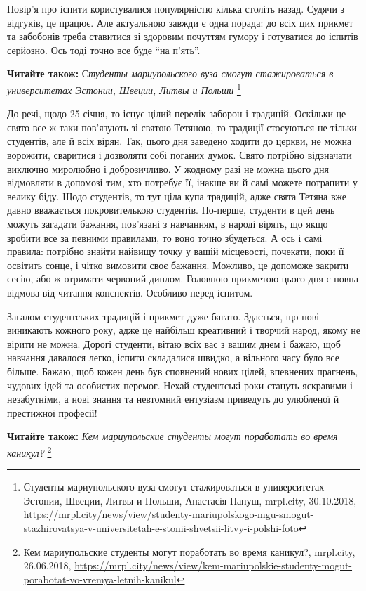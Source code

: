 
Повір'я про іспити користувалися популярністю кілька століть назад. Судячи з
відгуків, це працює. Але актуальною завжди є одна порада: до всіх цих прикмет
та забобонів треба ставитися зі здоровим почуттям гумору і готуватися до
іспитів серйозно. Ось тоді точно все буде \enquote{на п'ять}.

\textbf{Читайте також:} С\emph{туденты мариупольского вуза смогут стажироваться в университетах Эстонии, Швеции, Литвы и Польши}%
\footnote{Студенты мариупольского вуза смогут стажироваться в университетах Эстонии, Швеции, Литвы и Польши, Анастасія Папуш, %
mrpl.city, 30.10.2018, %
\url{https://mrpl.city/news/view/studenty-mariupolskogo-mgu-smogut-stazhirovatsya-v-universitetah-e-stonii-shvetsii-litvy-i-polshi-foto}}


До речі, щодо 25 січня, то існує цілий перелік заборон і традицій. Оскільки це
свято все ж таки пов'язують зі святою Тетяною, то традиції стосуються не тільки
студентів, але й всіх вірян. Так, цього дня заведено ходити до церкви, не можна
ворожити, сваритися і дозволяти собі поганих думок. Свято потрібно відзначати
виключно миролюбно і доброзичливо. У жодному разі не можна цього дня відмовляти
в допомозі тим, хто потребує її, інакше ви й самі можете потрапити у велику
біду. Щодо студентів, то тут ціла купа традицій, адже свята Тетяна вже давно
вважається покровителькою студентів. По-перше, студенти в цей день можуть
загадати бажання, пов'язані з навчанням, в народі вірять, що якщо зробити все
за певними правилами, то воно точно збудеться. А ось і самі правила: потрібно
знайти найвищу точку у вашій місцевості, почекати, поки її освітить сонце, і
чітко вимовити своє бажання. Можливо, це допоможе закрити сесію, або ж отримати
червоний диплом. Головною прикметою цього дня є повна відмова від читання
конспектів. Особливо перед іспитом.

Загалом студентських традицій і прикмет дуже багато. Здається, що нові
виникають кожного року, адже це найбільш креативний і творчий народ, якому не
вірити не можна. Дорогі студенти, вітаю всіх вас з вашим днем і бажаю, щоб
навчання давалося легко, іспити складалися швидко, а вільного часу було все
більше. Бажаю, щоб кожен день був сповнений нових цілей, впевнених прагнень,
чудових ідей та особистих перемог. Нехай студентські роки стануть яскравими і
незабутніми, а нові знання та невтомний ентузіазм приведуть до улюбленої й
престижної професії!

\textbf{Читайте також:} \emph{Кем мариупольские студенты могут поработать во время каникул?}%
\footnote{Кем мариупольские студенты могут поработать во время каникул?, mrpl.city, 26.06.2018, %
\url{https://mrpl.city/news/view/kem-mariupolskie-studenty-mogut-porabotat-vo-vremya-letnih-kanikul}%
}
